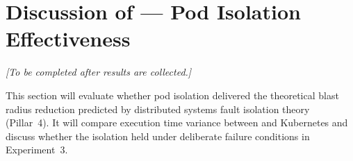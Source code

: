\section{Discussion of  --- Pod Isolation Effectiveness}

\textit{[To be completed after results are collected.]}

This section will evaluate whether pod isolation delivered the theoretical blast radius
reduction predicted by distributed systems fault isolation theory (Pillar~4). It will
compare execution time variance between \vm{} and Kubernetes and discuss whether the
isolation held under deliberate failure conditions in Experiment~3.
